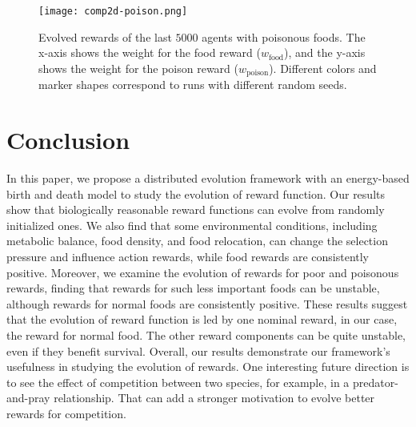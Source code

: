 \begin{figure}[t]
  \centering
  \texttt{[image: comp2d-poison.png]}
  \caption{
    Evolved rewards of the last $5000$ agents with poisonous foods.
    The x-axis shows the weight for the food reward ($w_{\mathrm{food}}$), and the y-axis shows the weight for the poison reward ($w_{\mathrm{poison}}$).
    Different colors and marker shapes correspond to runs with different random seeds.
  }\label{figure:result-poison}
\end{figure}

\section{Conclusion}
In this paper, we propose a distributed evolution framework with an energy-based birth and death model to study the evolution of reward function. Our results show that biologically reasonable reward functions can evolve from randomly initialized ones. We also find that some environmental conditions, including metabolic balance, food density, and food relocation, can change the selection pressure and influence action rewards, while food rewards are consistently positive. Moreover, we examine the evolution of rewards for poor and poisonous rewards, finding that rewards for such less important foods can be unstable, although rewards for normal foods are consistently positive. These results suggest that the evolution of reward function is led by one nominal reward, in our case, the reward for normal food. The other reward components can be quite unstable, even if they benefit survival. Overall, our results demonstrate our framework's usefulness in studying the evolution of rewards. One interesting future direction is to see the effect of competition between two species, for example, in a predator-and-pray relationship. That can add a stronger motivation to evolve better rewards for competition.

